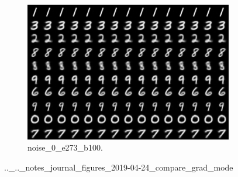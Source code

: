 \begin{figure}[!htbp]
\begin{subfigure}[t]{0.48\textwidth}
   \includegraphics[width=\textwidth,center]{2019-04-24/compare_grad_mode/noise_0_e273_b100.png}
   \caption{noise_0_e273_b100.}
   \label{fig:.._.._notes_journal_figures_2019-04-24_compare_grad_mode-i}
\end{subfigure}
   \caption{.._.._notes_journal_figures_2019-04-24_compare_grad_mode}
   \label{fig:2019-04-24_compare_grad_mode}
\end{figure}